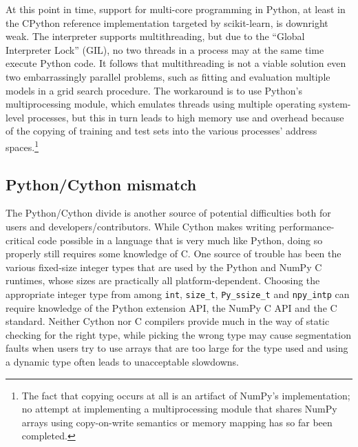 \documentclass{llncs}
\begin{document}
At this point in time, support for multi-core programming in Python,
at least in the CPython reference implementation targeted by scikit-learn,
is downright weak.
The interpreter supports multithreading, but due to the ``Global Interpreter Lock'' (GIL),
no two threads in a process may at the same time execute Python code.
It follows that multithreading is not a viable solution
even two embarrassingly parallel problems,
such as fitting and evaluation multiple models in a grid search procedure.
The workaround is to use Python's multiprocessing module,
which emulates threads using multiple operating system-level processes,
but this in turn leads to high memory use and overhead
because of the copying of training and test sets
into the various processes' address spaces.\footnote{
  The fact that copying occurs at all is an artifact of NumPy's implementation;
  no attempt at implementing a multiprocessing module
  that shares NumPy arrays using copy-on-write semantics or memory mapping
  has so far been completed.}

\subsection{Python/Cython mismatch}

The Python/Cython divide is another source of potential difficulties
both for users and developers/contributors.
While Cython makes writing performance-critical code possible
in a language that is very much like Python,
doing so properly still requires some knowledge of C.
One source of trouble has been the various fixed-size integer types
that are used by the Python and NumPy C runtimes,
whose sizes are practically all platform-dependent.
Choosing the appropriate integer type from among
\texttt{int}, \texttt{size\_t}, \texttt{Py\_ssize\_t} and \texttt{npy\_intp}
can require knowledge of the Python extension API,
the NumPy C API and the C standard.
Neither Cython nor C compilers provide much in the way of static checking
for the right type,
while picking the wrong type may cause segmentation faults
when users try to use arrays that are too large for the type used
and using a dynamic type often leads to unacceptable slowdowns.
\end{document}
